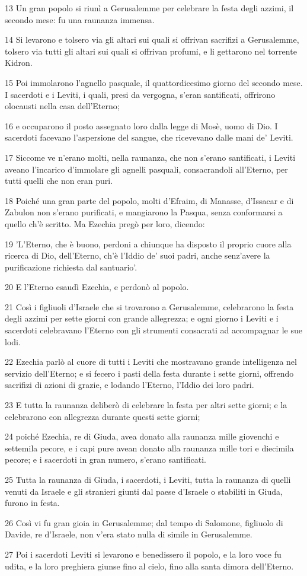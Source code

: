 \par 13 Un gran popolo si riunì a Gerusalemme per celebrare la festa degli azzimi, il secondo mese: fu una raunanza immensa.
\par 14 Si levarono e tolsero via gli altari sui quali si offrivan sacrifizi a Gerusalemme, tolsero via tutti gli altari sui quali si offrivan profumi, e li gettarono nel torrente Kidron.
\par 15 Poi immolarono l'agnello pasquale, il quattordicesimo giorno del secondo mese. I sacerdoti e i Leviti, i quali, presi da vergogna, s'eran santificati, offrirono olocausti nella casa dell'Eterno;
\par 16 e occuparono il posto assegnato loro dalla legge di Mosè, uomo di Dio. I sacerdoti facevano l'aspersione del sangue, che ricevevano dalle mani de' Leviti.
\par 17 Siccome ve n'erano molti, nella raunanza, che non s'erano santificati, i Leviti aveano l'incarico d'immolare gli agnelli pasquali, consacrandoli all'Eterno, per tutti quelli che non eran puri.
\par 18 Poiché una gran parte del popolo, molti d'Efraim, di Manasse, d'Issacar e di Zabulon non s'erano purificati, e mangiarono la Pasqua, senza conformarsi a quello ch'è scritto. Ma Ezechia pregò per loro, dicendo:
\par 19 'L'Eterno, che è buono, perdoni a chiunque ha disposto il proprio cuore alla ricerca di Dio, dell'Eterno, ch'è l'Iddio de' suoi padri, anche senz'avere la purificazione richiesta dal santuario'.
\par 20 E l'Eterno esaudì Ezechia, e perdonò al popolo.
\par 21 Così i figliuoli d'Israele che si trovarono a Gerusalemme, celebrarono la festa degli azzimi per sette giorni con grande allegrezza; e ogni giorno i Leviti e i sacerdoti celebravano l'Eterno con gli strumenti consacrati ad accompagnar le sue lodi.
\par 22 Ezechia parlò al cuore di tutti i Leviti che mostravano grande intelligenza nel servizio dell'Eterno; e si fecero i pasti della festa durante i sette giorni, offrendo sacrifizi di azioni di grazie, e lodando l'Eterno, l'Iddio dei loro padri.
\par 23 E tutta la raunanza deliberò di celebrare la festa per altri sette giorni; e la celebrarono con allegrezza durante questi sette giorni;
\par 24 poiché Ezechia, re di Giuda, avea donato alla raunanza mille giovenchi e settemila pecore, e i capi pure avean donato alla raunanza mille tori e diecimila pecore; e i sacerdoti in gran numero, s'erano santificati.
\par 25 Tutta la raunanza di Giuda, i sacerdoti, i Leviti, tutta la raunanza di quelli venuti da Israele e gli stranieri giunti dal paese d'Israele o stabiliti in Giuda, furono in festa.
\par 26 Così vi fu gran gioia in Gerusalemme; dal tempo di Salomone, figliuolo di Davide, re d'Israele, non v'era stato nulla di simile in Gerusalemme.
\par 27 Poi i sacerdoti Leviti si levarono e benedissero il popolo, e la loro voce fu udita, e la loro preghiera giunse fino al cielo, fino alla santa dimora dell'Eterno.

